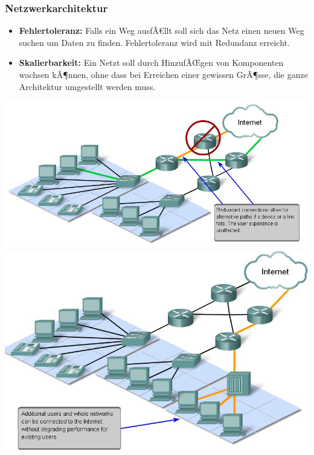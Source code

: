 \documentclass[a4paper,10pt]{article}
\newcommand{\Bold}[1]{\textbf{#1}} %
\begin{document}
\subsubsection{Netzwerkarchitektur}
\begin{itemize}
 \item \Bold{Fehlertoleranz:} Falls ein Weg ausfÃ€llt soll sich das Netz einen neuen Weg suchen um Daten zu finden. Fehlertoleranz wird mit Redundanz erreicht.
 \item  \Bold{Skalierbarkeit:} Ein Netzt soll durch HinzufÃŒgen von Komponenten wachsen kÃ¶nnen, ohne dass bei Erreichen einer gewissen GrÃ¶sse, die ganze Architektur umgestellt werden muss.
\end{itemize}
\includegraphics[scale=0.3]{DNet1_1.png} \includegraphics[scale=0.3]{DNet1_2.png}
\end{document}
